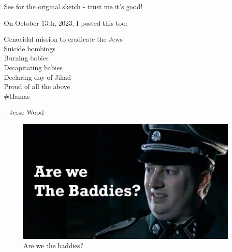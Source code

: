 \documentclass[16pt,openany,oneside]{book}
\begin{document}
See  \cite{mitchell2013baddies} for the original sketch - trust me it's good! 

On October 13th, 2023, I posted this too:

\epigraph{
    \> Genocidal mission to eradicate the Jews \\
    \> Suicide bombings \\
    \> Burning babies \\ 
    \> Decapitating babies \\ 
    \> Declaring day of Jihad \\ 
    \> Proud of all the above \\ 
    \> \#Hamas
}{-- Jesse Wood \cite{wood2023baddieshamas2}}

\begin{figure} [H]
    \centering
    \includegraphics[width=0.5\linewidth]{assets/baddies.jpg}
    \caption{Are we the baddies?}
    \label{fig:badies-2}
\end{figure}
\end{document}
